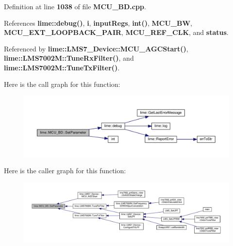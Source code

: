 Definition at line {\bf 1038} of file {\bf M\+C\+U\+\_\+\+B\+D.\+cpp}.



References {\bf lime\+::debug()}, {\bf i}, {\bf input\+Regs}, {\bf int()}, {\bf M\+C\+U\+\_\+\+BW}, {\bf M\+C\+U\+\_\+\+E\+X\+T\+\_\+\+L\+O\+O\+P\+B\+A\+C\+K\+\_\+\+P\+A\+IR}, {\bf M\+C\+U\+\_\+\+R\+E\+F\+\_\+\+C\+LK}, and {\bf status}.



Referenced by {\bf lime\+::\+L\+M\+S7\+\_\+\+Device\+::\+M\+C\+U\+\_\+\+A\+G\+C\+Start()}, {\bf lime\+::\+L\+M\+S7002\+M\+::\+Tune\+Rx\+Filter()}, and {\bf lime\+::\+L\+M\+S7002\+M\+::\+Tune\+Tx\+Filter()}.



Here is the call graph for this function\+:
\nopagebreak
\begin{figure}[H]
\begin{center}
\leavevmode
\includegraphics[width=350pt]{d8/d9c/classlime_1_1MCU__BD_ad4bff788d7e2763b110940935f42361b_cgraph}
\end{center}
\end{figure}




Here is the caller graph for this function\+:
\nopagebreak
\begin{figure}[H]
\begin{center}
\leavevmode
\includegraphics[width=350pt]{d8/d9c/classlime_1_1MCU__BD_ad4bff788d7e2763b110940935f42361b_icgraph}
\end{center}
\end{figure}


